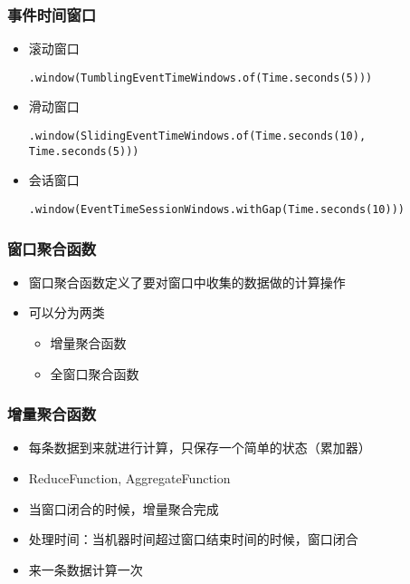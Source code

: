 \documentclass{beamer}
\begin{document}
  \begin{frame}[fragile]
      \frametitle{事件时间窗口}
  
      \begin{itemize}
          \item 滚动窗口
            \begin{verbatim}
.window(TumblingEventTimeWindows.of(Time.seconds(5)))
            \end{verbatim}
          \item 滑动窗口
            \begin{verbatim}
.window(SlidingEventTimeWindows.of(Time.seconds(10), Time.seconds(5)))
            \end{verbatim}
          \item 会话窗口
            \begin{verbatim}
.window(EventTimeSessionWindows.withGap(Time.seconds(10)))
            \end{verbatim}
      \end{itemize}
  
  \end{frame}

  \begin{frame}
      \frametitle{窗口聚合函数}
  
      \begin{itemize}
          \item 窗口聚合函数定义了要对窗口中收集的数据做的计算操作
          \item 可以分为两类
          \begin{itemize}
              \item 增量聚合函数
              \item 全窗口聚合函数
          \end{itemize}
      \end{itemize}
  
  \end{frame}

  \begin{frame}
      \frametitle{增量聚合函数}
  
      \begin{itemize}
          \item 每条数据到来就进行计算，只保存一个简单的状态（累加器）
          \item ReduceFunction, AggregateFunction
          \item 当窗口闭合的时候，增量聚合完成
          \item 处理时间：当机器时间超过窗口结束时间的时候，窗口闭合
          \item 来一条数据计算一次
      \end{itemize}
  
  \end{frame}
\end{document}
